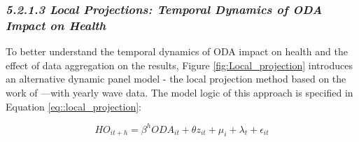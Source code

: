 

\subsubsection*{\quad \quad \textit{5.2.1.3 Local Projections: Temporal Dynamics of ODA Impact on Health}}
To better understand the temporal dynamics of ODA impact on health and the effect of data aggregation on the results, Figure \ref{fig:Local_projection} introduces an alternative dynamic panel model - the local projection method based on the work of \textcite{jorda2005estimation}—with yearly wave data. The model logic of this approach is specified in Equation \ref{eq::local_projection}:

\begin{equation}
HO_{it + h} = \beta^h ODA_{it} + \theta z_{it} + \mu_{i} + \lambda_{t} + \epsilon_{it}
\label{eq::local_projection}
\end{equation}

